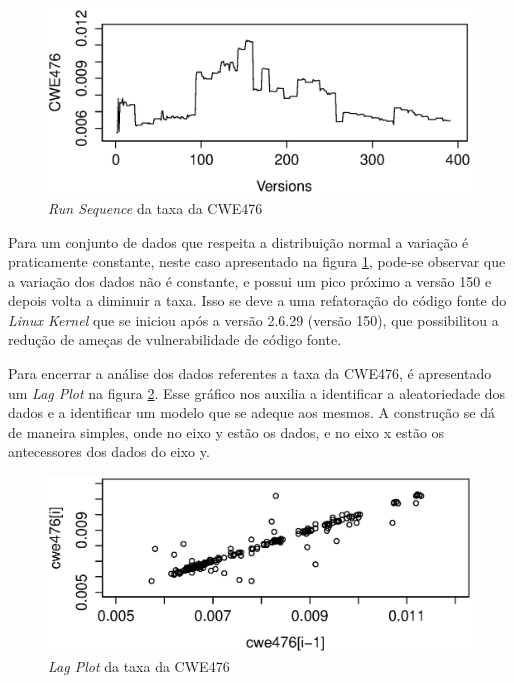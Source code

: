 \begin{figure}[h]
  \centering
  \includegraphics[width=1.0\textwidth]
      {figuras/cwe476-run-sequence.eps}
      \caption{\textit{Run Sequence} da taxa da CWE476}
      \label{fig:cwe476-run-sequence}
\end{figure}

Para um conjunto de dados que respeita a distribuição normal a variação é
praticamente constante, neste caso apresentado na figura
\ref{fig:cwe476-run-sequence}, pode-se observar que a variação dos dados não é
constante, e possui um pico próximo a versão 150 e depois volta a diminuir a
taxa. Isso se deve a uma refatoração do código fonte do \textit{Linux Kernel}
que se iniciou após a versão 2.6.29 (versão 150), que possibilitou a redução de
ameças de vulnerabilidade de código fonte.

Para encerrar a análise dos dados referentes a taxa da CWE476, é apresentado um
\textit{Lag Plot} na figura \ref{fig:cwe476-lag-plot}. Esse gráfico nos auxilia
a identificar a aleatoriedade dos dados e a identificar um modelo que se adeque
aos mesmos. A construção se dá de maneira simples, onde no eixo y estão os
dados, e no eixo x estão os antecessores dos dados do eixo y.

\begin{figure}[h]
  \centering
  \includegraphics[width=1.0\textwidth]
      {figuras/cwe476-lag-plot.eps}
      \caption{\textit{Lag Plot} da taxa da CWE476}
      \label{fig:cwe476-lag-plot}
\end{figure}

